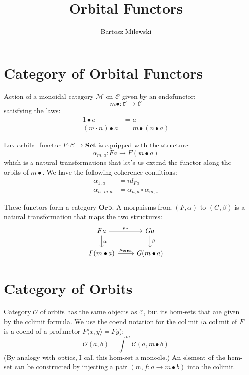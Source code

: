 \documentclass[11pt]{amsart}
\author{Bartosz Milewski}
\title{Orbital Functors}
\newcommand{\cat}[1]{\mathcal{#1}}%
\newcommand{\Cat}[1]{\mathbf{#1}}%
\newcommand{\Set}{\Cat{Set}}
\begin{document}
\maketitle{}

\section{Category of Orbital Functors}

Action of a monoidal category $\cat M$ on $\cat C$ given by an endofunctor:
\[ m \bullet \colon \cat C \to \cat C \]
satisfying the laws:
\begin{align*}
1 \bullet a &= a \\
(m \cdot n) \bullet a &= m \bullet (n \bullet a)
\end{align*}

Lax orbital functor $F \colon \cat C \to \Set$ is equipped with the structure:
\[ \alpha_{m, a} \colon F a \to F (m \bullet a) \]
which is a natural transformations that let's us extend the functor along the orbits of $m \bullet$. We have the following coherence conditions:
\begin{align*}
\alpha_{1, a} &= id_{F a} \\
\alpha_{n \cdot m, a} &= \alpha_{n, a} \circ \alpha_{m, a}
\end{align*}

These functors form a category $\mathbf{Orb}$.  A morphisms from $(F, \alpha)$ to $(G, \beta)$ is a natural transformation that maps the two structures:
\[
\begin{tikzcd}
F a
\arrow[r, "\mu_a"]
\arrow[d, "\alpha"]
& G a
\arrow[d, "\beta"]
\\ F (m \bullet a) 
\arrow[r, "\mu_{m \bullet a}"]
& G (m \bullet a)
\end{tikzcd}
\]

\section{Category of Orbits}

Category $\cat O$ of orbits has the same objects as $\cat C$, but its hom-sets that are given by the colimit formula. We use the coend notation for the colimit (a colimit of $F$ is a coend of a profunctor $P\langle x, y \rangle = F y$):
\[ \cat O(a, b) = \int^m \cat C(a, m \bullet b) \]
(By analogy with optics, I call this hom-set a monocle.) An element of the hom-set can be constructed by injecting a pair $(m, f \colon a \to m \bullet b)$ into the colimit.
\end{document}
